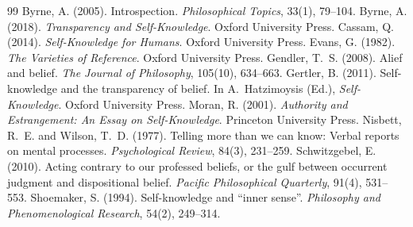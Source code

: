 \documentclass{situationist-preprint}
\begin{document}
\begin{thebibliography}{99}\small
{} Byrne, A. (2005). Introspection. \emph{Philosophical Topics}, 33(1), 79--104.
 Byrne, A. (2018). \emph{Transparency and Self-Knowledge}. Oxford University Press.
 Cassam, Q. (2014). \emph{Self-Knowledge for Humans}. Oxford University Press.
 Evans, G. (1982). \emph{The Varieties of Reference}. Oxford University Press.
 Gendler, T.~S. (2008). Alief and belief. \emph{The Journal of Philosophy}, 105(10), 634--663.
 Gertler, B. (2011). Self-knowledge and the transparency of belief. In A.~Hatzimoysis (Ed.), \emph{Self-Knowledge}. Oxford University Press.
 Moran, R. (2001). \emph{Authority and Estrangement: An Essay on Self-Knowledge}. Princeton University Press.
 Nisbett, R.~E. and Wilson, T.~D. (1977). Telling more than we can know: Verbal reports on mental processes. \emph{Psychological Review}, 84(3), 231--259.
 Schwitzgebel, E. (2010). Acting contrary to our professed beliefs, or the gulf between occurrent judgment and dispositional belief. \emph{Pacific Philosophical Quarterly}, 91(4), 531--553.
 Shoemaker, S. (1994). Self-knowledge and \enquote{inner sense}. \emph{Philosophy and Phenomenological Research}, 54(2), 249--314.
\end{thebibliography}
\end{document}
